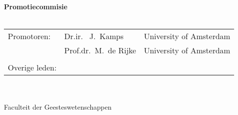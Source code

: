 {%
\clearpage
\noindent%
{\bf Promotiecommisie}\\
\\
\begin{tabular}[t]{@{}llr}
Promotoren:      
& Dr.ir. \ J.~Kamps  & University of Amsterdam \\  
& Prof.dr.\ M.~de Rijke  & University of Amsterdam \\  

\\
Overige leden: 


\end{tabular}\\
\\
Faculteit der Geesteswetenschappen \\ %
\clearpage
} %

